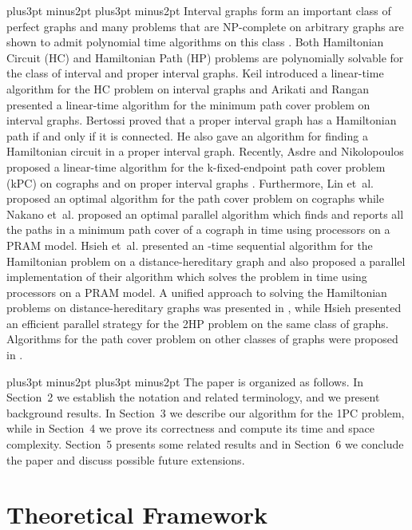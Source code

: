 \documentclass[10pt]{article}
\def\yskip{\penalty-50\vskip3pt plus3pt minus2pt}
\def\yy{\yskip\yskip}
\begin{document}
\yy{} Interval graphs form an important
class of perfect graphs \cite{Gol} and many problems that are
NP-complete on arbitrary graphs are shown to admit polynomial time
algorithms on this class \cite{AR90, Gol, Keil}. Both Hamiltonian
Circuit (HC) and Hamiltonian Path (HP) problems are polynomially
solvable for the class of interval and proper interval graphs.
Keil introduced a linear-time algorithm for the HC problem on
interval graphs \cite{Keil} and Arikati and Rangan \cite{AR90}
presented a linear-time algorithm for the minimum path cover
problem on interval graphs. Bertossi \cite{Bertossi} proved that a
proper interval graph has a Hamiltonian path if and only if it is
connected. He also gave an  algorithm for finding a
Hamiltonian circuit in a proper interval graph. Recently, Asdre
and Nikolopoulos proposed a linear-time algorithm for the
k-fixed-endpoint path cover problem (kPC) on cographs and on
proper interval graphs \cite{AsdNik, AsdNik2}. Furthermore, Lin
et~al. \cite{LiOlPru95} proposed an optimal algorithm for the path
cover problem on cographs while Nakano et~al. \cite{NaOlZo03}
proposed an optimal parallel algorithm which finds and reports all
the paths in a minimum path cover of a cograph in  time
using  processors on a PRAM model. Hsieh et~al.
\cite{HsiehHoHsuKo} presented an -time sequential
algorithm for the Hamiltonian problem on a distance-hereditary
graph and also proposed a parallel implementation of their
algorithm which solves the problem in  time using
 processors on a PRAM model. A unified approach
to solving the Hamiltonian problems on distance-hereditary graphs
was presented in \cite{HungChangDH}, while Hsieh \cite{Hsieh}
presented an efficient parallel strategy for the 2HP problem on
the same class of graphs. Algorithms for the path cover problem on
other classes of graphs were proposed in \cite{HungChangCA, Nik,
SSSR93}.

\yy{} The paper is organized as follows. In
Section~2 we establish the notation and related terminology, and
we present background results. In Section~3 we describe our
algorithm for the 1PC problem, while in Section~4 we prove its
correctness and compute its time and space complexity. Section~5
presents some related results and in Section~6 we conclude the
paper and discuss possible future extensions.



\section{Theoretical Framework}
\end{document}
